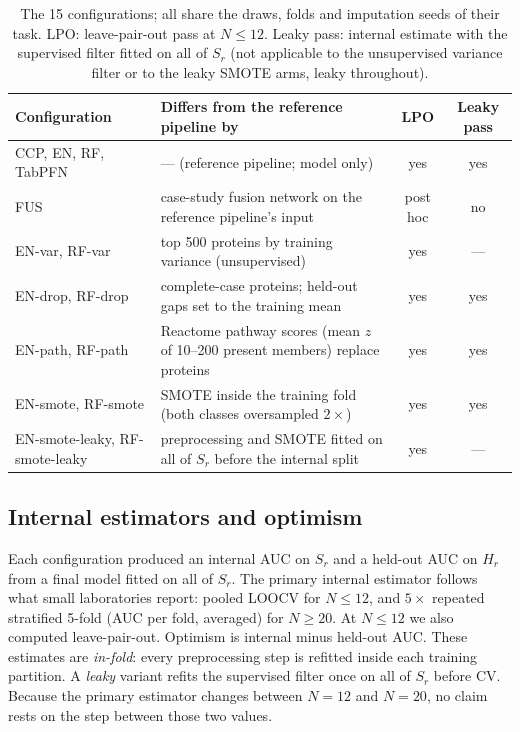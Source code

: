 \documentclass[10pt,letterpaper]{article}
\begin{document}
\begin{table}[t]
\centering
\caption{The 15 configurations; all share the draws, folds and imputation seeds of their task. LPO:
leave-pair-out pass at $N \le 12$. Leaky pass: internal estimate with the supervised filter fitted on all of
$S_r$ (not applicable to the unsupervised variance filter or to the leaky SMOTE arms, leaky throughout).}
\label{tab:configs}
\begin{tabularx}{\textwidth}{@{}l X c c@{}}
\toprule
Configuration & Differs from the reference pipeline by & LPO & Leaky pass \\
\midrule
CCP, EN, RF, TabPFN & --- (reference pipeline; model only) & yes & yes \\
FUS & case-study fusion network on the reference pipeline's input & post hoc & no \\
EN-var, RF-var & top 500 proteins by training variance (unsupervised) & yes & --- \\
EN-drop, RF-drop & complete-case proteins; held-out gaps set to the training mean & yes & yes \\
EN-path, RF-path & Reactome pathway scores (mean $z$ of 10--200 present members) replace proteins & yes & yes \\
EN-smote, RF-smote & SMOTE inside the training fold (both classes oversampled $2\times$) & yes & yes \\
EN-smote-leaky, RF-smote-leaky & preprocessing and SMOTE fitted on all of $S_r$ before the internal split & yes & --- \\
\bottomrule
\end{tabularx}
\end{table}

\subsection{Internal estimators and optimism}
Each configuration produced an internal AUC on $S_r$ and a held-out AUC on $H_r$ from a final model fitted on
all of $S_r$. The primary internal estimator follows what small laboratories report: pooled LOOCV for
$N \le 12$, and $5\times$ repeated stratified 5-fold (AUC per fold, averaged) for $N \ge 20$. At $N \le 12$ we
also computed leave-pair-out. Optimism is internal minus held-out AUC. These estimates are \emph{in-fold}:
every preprocessing step is refitted inside each training partition. A \emph{leaky} variant refits the
supervised filter once on all of $S_r$ before CV. Because the primary estimator changes between $N = 12$ and
$N = 20$, no claim rests on the step between those two values.
\end{document}
